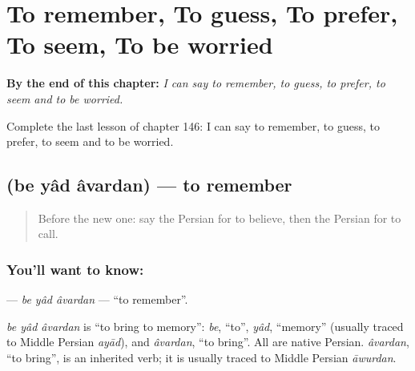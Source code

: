 
\chapter{To remember, To guess, To prefer, To seem, To be worried}
\label{ch:fa-to-remember-to-guess-to-prefer-to-seem-to-be-worried}

\begin{chapteropening}
\textbf{By the end of this chapter:} \emph{I can say to remember, to guess, to prefer, to seem and to be worried.}

Complete the last lesson of chapter 146: I can say to remember, to guess, to prefer, to seem and to be worried.
\end{chapteropening}

\section[\texorpdfstring{\fa{به} \fa{یاد} \fa{آوردن} (be yâd âvardan)}{به یاد آوردن (be yâd âvardan)}]{   (be yâd âvardan) — to remember}

\label{lesson:FA-C146-be-yad-avardan}



\begin{quote}
Before the new one: say the Persian for to believe, then the Persian for to call.
\end{quote}

\subsection*{You'll want to know:   }
\textbf{  } — \emph{be yâd âvardan} — \textquotedblleft{}to remember\textquotedblright{}.

\begin{cousinweb}
\emph{be yâd âvardan} is \textquotedblleft{}to bring to memory\textquotedblright{}: \emph{be}, \textquotedblleft{}to\textquotedblright{}, \emph{yâd}, \textquotedblleft{}memory\textquotedblright{} (usually traced to Middle Persian \emph{ayād}), and \emph{âvardan}, \textquotedblleft{}to bring\textquotedblright{}. All are native Persian. \emph{âvardan}, \textquotedblleft{}to bring\textquotedblright{}, is an inherited verb; it is usually traced to Middle Persian \emph{āwurdan}.
\end{cousinweb}

